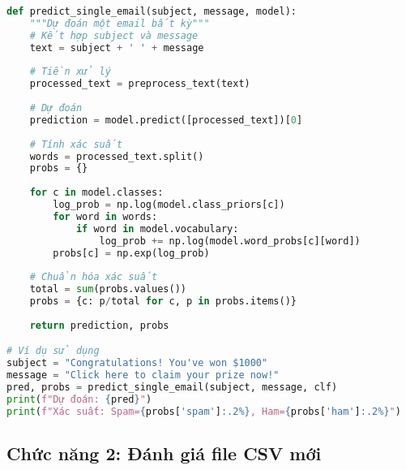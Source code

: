 \begin{lstlisting}[language=Python]
def predict_single_email(subject, message, model):
    """Dự đoán một email bất kỳ"""
    # Kết hợp subject và message
    text = subject + ' ' + message
    
    # Tiền xử lý
    processed_text = preprocess_text(text)
    
    # Dự đoán
    prediction = model.predict([processed_text])[0]
    
    # Tính xác suất
    words = processed_text.split()
    probs = {}
    
    for c in model.classes:
        log_prob = np.log(model.class_priors[c])
        for word in words:
            if word in model.vocabulary:
                log_prob += np.log(model.word_probs[c][word])
        probs[c] = np.exp(log_prob)
    
    # Chuẩn hóa xác suất
    total = sum(probs.values())
    probs = {c: p/total for c, p in probs.items()}
    
    return prediction, probs

# Ví dụ sử dụng
subject = "Congratulations! You've won $1000"
message = "Click here to claim your prize now!"
pred, probs = predict_single_email(subject, message, clf)
print(f"Dự đoán: {pred}")
print(f"Xác suất: Spam={probs['spam']:.2%}, Ham={probs['ham']:.2%}")
\end{lstlisting}

\subsection{Chức năng 2: Đánh giá file CSV mới}


